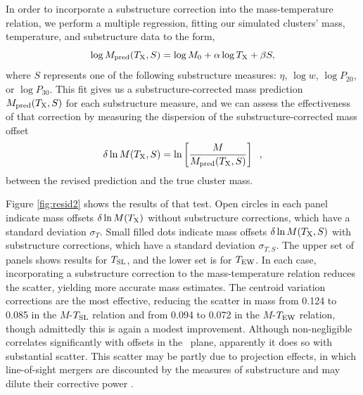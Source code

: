 \documentclass{aastex} \usepackage{natbib}
\begin{document}
In order to incorporate a substructure correction into the
mass-temperature relation, we perform a multiple regression, fitting
our simulated clusters' mass, temperature, and substructure data to
the form,
\begin{equation}
  \log M_{\rm pred} (T_{\rm X},S) = \log M_0 + \alpha \log T_{\rm X} + \beta S ,
  \label{eq:mass-temp-subst}
\end{equation}
where $S$ represents one of the following substructure measures:
$\eta$, $\log w$, $\log P_{20}$, or $\log P_{30}$.  This fit gives us
a substructure-corrected mass prediction $M_{\rm pred} (T_{\rm X}, S)$ for
each substructure measure, and we can assess the effectiveness of that
correction by measuring the dispersion of the substructure-corrected
mass offset
\begin{equation}
  \delta \ln M (T_{\rm X},S) = \ln \left[ \frac {M} {M_{\rm pred}(T_{\rm X},S)} \right] \; \; ,
  \label{eq:deltaMTS}
\end{equation}
between the revised prediction and the true cluster mass.

Figure \ref{fig:resid2} shows the results of that test.  Open circles
in each panel indicate mass offsets $\delta \ln M(T_{\rm X})$ without
substructure corrections, which have a standard deviation
$\sigma_{T}$.  Small filled dots indicate mass offsets $\delta \ln
M(T_{\rm X},S)$ with substructure corrections, which have a standard
deviation $\sigma_{T,S}$.  The upper set of panels shows results for
$T_{\rm SL}$, and the lower set is for $T_{\rm EW}$.  In each case, incorporating
a substructure correction to the mass-temperature relation reduces the
scatter, yielding more accurate mass estimates.  The centroid
variation corrections are the most effective, reducing the scatter in
mass from 0.124 to 0.085 in the $M$-$T_{\rm SL}$ relation and from 0.094 to
0.072 in the $M$-$T_{\rm EW}$ relation, though admittedly this is again a
modest improvement.  Although non-negligible correlates significantly
with offsets in the \mtx\ plane, apparently it does so with
substantial scatter.  This scatter may be partly due to projection
effects, in which line-of-sight mergers are discounted by the measures
of substructure and may dilute their corrective power
\citep{2007arXiv0708.1518J}.
\end{document}
